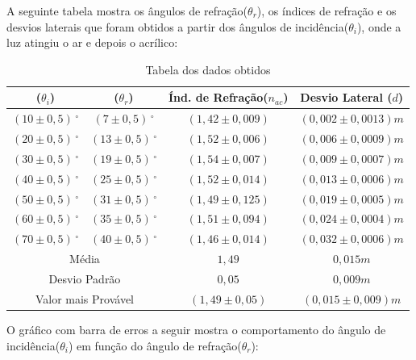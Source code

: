 \documentclass[
	12pt,				%
	oneside,			%
	a4paper,			%
	english,			%
	french,				%
	spanish,			%
	brazil				%
	]{abntex2}
\begin{document}
\newpage
A seguinte tabela mostra os ângulos de refração($\theta_r$), os índices de refração e os desvios laterais que foram obtidos a partir dos ângulos de incidência($\theta_i$), onde a luz atingiu o ar e depois o acrílico: 

\begin{table}[htb]
	\centering
	\begin{tabular}{c|c|c|c}
		\hline		
		($\theta_i$) & ($\theta_r$) & Índ. de Refração($n_{ac}$) & Desvio Lateral ($d$)\\
		\hline
		$(10\pm 0,5)\,^{\circ}$ & $(7 \pm 0,5)\,^{\circ}$ & $(1,42 \pm 0,009)$ & $(0,002 \pm 0,0013)m$\\
		$(20\pm 0,5)\,^{\circ}$ & $(13 \pm 0,5)\,^{\circ}$ & $(1,52 \pm 0,006)$ & $(0,006 \pm 0,0009)m$\\
		$(30\pm 0,5)\,^{\circ}$ & $(19 \pm 0,5)\,^{\circ}$ & $(1,54 \pm 0,007)$ & $(0,009 \pm 0,0007)m$\\
		$(40\pm 0,5)\,^{\circ}$ & $(25 \pm 0,5)\,^{\circ}$ & $(1,52 \pm 0,014)$ & $(0,013 \pm 0,0006)m$\\
		$(50\pm 0,5)\,^{\circ}$ & $(31 \pm 0,5)\,^{\circ}$ & $(1,49 \pm 0,125)$ & $(0,019 \pm 0,0005)m$\\
		$(60\pm 0,5)\,^{\circ}$ & $(35 \pm 0,5)\,^{\circ}$ & $(1,51 \pm 0,094)$ & $(0,024 \pm 0,0004)m$\\
		$(70\pm 0,5)\,^{\circ}$ & $(40 \pm 0,5)\,^{\circ}$ & $(1,46 \pm 0,014)$ & $(0,032 \pm 0,0006)m$\\		
		\hline
		\multicolumn{2}{c|}{Média} &$1,49$ & $0,015 m$\\
		\hline
		\multicolumn{2}{c|}{Desvio Padrão} &$0,05$ & $0,009 m$\\
		\hline
		\multicolumn{2}{c|}{Valor mais Provável} &$(1,49 \pm 0,05)$ &  $(0,015 \pm 0,009)m$\\
		\hline		
	\end{tabular}
	\caption{Tabela dos dados obtidos}
	\label{tabela-2}
\end{table}

O gráfico com barra de erros a seguir mostra o comportamento do ângulo de incidência($\theta_i$) em função do ângulo de refração($\theta_r$):
\end{document}
